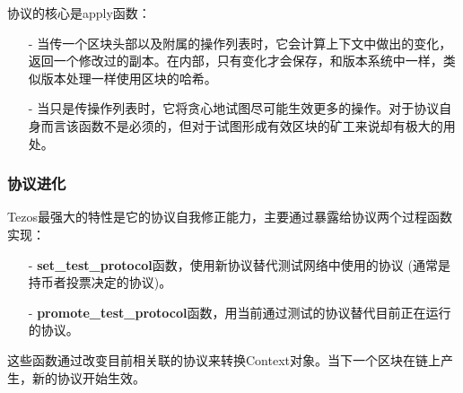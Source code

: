 \documentclass[letterpaper]{article}
\begin{document}
协议的核心是apply函数：

\begin{itemize}
\item[-] %
当传一个区块头部以及附属的操作列表时，它会计算上下文中做出的变化，返回一个修改过的副本。在内部，只有变化才会保存，和版本系统中一样，类似版本处理一样使用区块的哈希。
\item[-] %
当只是传操作列表时，它将贪心地试图尽可能生效更多的操作。对于协议自身而言该函数不是必须的，但对于试图形成有效区块的矿工来说却有极大的用处。
\end{itemize}

\subsubsection{协议进化}

Tezos最强大的特性是它的协议自我修正能力，主要通过暴露给协议两个过程函数实现：

\begin{itemize}
\item[-] %
\textbf{set\_test\_protocol}函数，使用新协议替代测试网络中使用的协议 (通常是持币者投票决定的协议)。
\item[-] %
\textbf{promote\_test\_protocol}函数，用当前通过测试的协议替代目前正在运行的协议。
\end{itemize}

这些函数通过改变目前相关联的协议来转换Context对象。当下一个区块在链上产生，新的协议开始生效。
\end{document}
